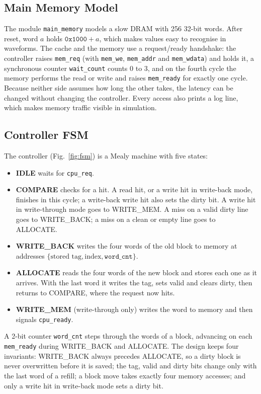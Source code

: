 \documentclass[conference]{IEEEtran}
\newcommand{\sig}[1]{\texttt{#1}}
\begin{document}
\subsection{Main Memory Model}
The module \sig{main\_memory} models a slow DRAM with 256 32-bit words. After reset, word $a$ holds $\texttt{0x1000} + a$, which makes values easy to recognise in waveforms. The cache and the memory use a request/ready handshake: the controller raises \sig{mem\_req} (with \sig{mem\_we}, \sig{mem\_addr} and \sig{mem\_wdata}) and holds it, a synchronous counter \sig{wait\_count} counts 0 to 3, and on the fourth cycle the memory performs the read or write and raises \sig{mem\_ready} for exactly one cycle. Because neither side assumes how long the other takes, the latency can be changed without changing the controller. Every access also prints a log line, which makes memory traffic visible in simulation.

\subsection{Controller FSM}
The controller (Fig.~\ref{fig:fsm}) is a Mealy machine with five states:
\begin{itemize}
\item \textbf{IDLE} waits for \sig{cpu\_req}.
\item \textbf{COMPARE} checks for a hit. A read hit, or a write hit in write-back mode, finishes in this cycle; a write-back write hit also sets the dirty bit. A write hit in write-through mode goes to WRITE\_MEM. A miss on a valid dirty line goes to WRITE\_BACK; a miss on a clean or empty line goes to ALLOCATE.
\item \textbf{WRITE\_BACK} writes the four words of the old block to memory at addresses $\{\text{stored tag}, \text{index}, \sig{word\_cnt}\}$.
\item \textbf{ALLOCATE} reads the four words of the new block and stores each one as it arrives. With the last word it writes the tag, sets valid and clears dirty, then returns to COMPARE, where the request now hits.
\item \textbf{WRITE\_MEM} (write-through only) writes the word to memory and then signals \sig{cpu\_ready}.
\end{itemize}
A 2-bit counter \sig{word\_cnt} steps through the words of a block, advancing on each \sig{mem\_ready} during WRITE\_BACK and ALLOCATE. The design keeps four invariants: WRITE\_BACK always precedes ALLOCATE, so a dirty block is never overwritten before it is saved; the tag, valid and dirty bits change only with the last word of a refill; a block move takes exactly four memory accesses; and only a write hit in write-back mode sets a dirty bit.
\end{document}

